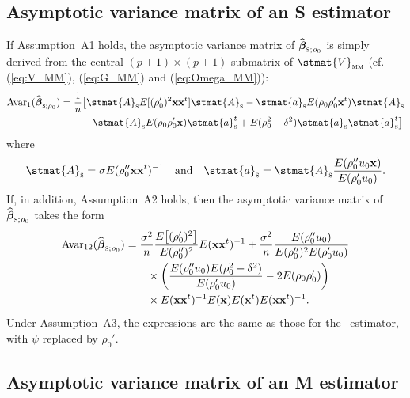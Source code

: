 \subsection{Asymptotic variance matrix of an S estimator}

If Assumption~A1 holds, the asymptotic variance matrix of 
$\sthat{\boldsymbol\beta}_{\stsc{S};\rho_0}$ is simply derived from the central
$(p+1) \times (p+1)$ submatrix of $\stmat{V}_\stsc{MM}$ (cf.
(\ref{eq:V_MM}), (\ref{eq:G_MM}) and (\ref{eq:Omega_MM})):
\[
\begin{split}
    \mathrm{Avar}_1(\sthat{\boldsymbol\beta}_{\stsc{S};\rho_0})
    & = \frac{1}{n} \big[ 
        \stmat{A}_{\stsc{S}} E[(\rho_0')^2\stvec{x}\stvec{x}^t] \stmat{A}_{\stsc{S}}
        - \stmat{a}_{\stsc{S}} E(\rho_0\rho_0'\stvec{x}^t) \stmat{A}_{\stsc{S}}
    \\
    & \qquad
        - \stmat{A}_{\stsc{S}} E(\rho_0\rho_0'\stvec{x}) \stmat{a}_{\stsc{S}}^t
        + E(\rho_0^2-\delta^2) \stmat{a}_{\stsc{S}}\stmat{a}_{\stsc{S}}^t
    \big]
\end{split}
\]
where
\[
    \stmat{A}_{\stsc{S}} = \sigma E(\rho_0''\stvec{x}\stvec{x}^t)^{-1}
    \quad\text{and}\quad
    \stmat{a}_{\stsc{S}} = \stmat{A}_{\stsc{S}}
        \frac{E(\rho_0''u_0\stvec{x})}{E(\rho_0'u_0)}.
\]
If, in addition, Assumption~A2 holds, then the asymptotic variance matrix of
$\sthat{\boldsymbol\beta}_{\stsc{S};\rho_0}$ takes the form
\[
\begin{split}
    \mathrm{Avar}_{12}(\sthat{\boldsymbol\beta}_{\stsc{S};\rho_0})
    & = \frac{\sigma^2}{n}\frac{E\left[(\rho_0')^2\right]}
            {E(\rho_0'')^2} E(\stvec{x}\stvec{x}^t)^{-1}
        + \frac{\sigma^2}{n} \frac{E(\rho_0''u_0)}{E(\rho_0'')^2
              E(\rho_0'u_0)}
    \\
    & \qquad
    \times \left(\frac{E(\rho_0''u_0) E(\rho_0^2-\delta^2)}{E(\rho_0'u_0)}
        - 2 E(\rho_0\rho_0')\right)
    \\
    & \qquad
    \times E(\stvec{x}\stvec{x}^t)^{-1} E(\stvec{x}) 
        E(\stvec{x}^t) E(\stvec{x}\stvec{x}^t)^{-1}.
\end{split}
\]
Under Assumption~A3, the expressions are the same as those for the
~estimator, with $\psi$ replaced by $\rho_0'$.

\subsection{Asymptotic variance matrix of an M estimator}


